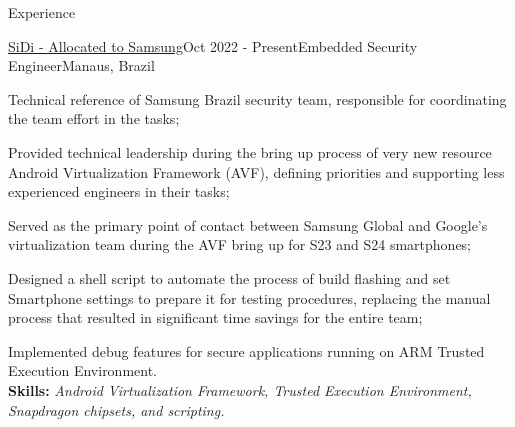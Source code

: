 \documentclass[
	11pt, %
]{resume} %
\begin{document}
\begin{rSection}{Experience}

	\begin{rSubsection}{\href{https://www.sidi.org.br/en/sobre-nos}{SiDi - Allocated to Samsung}}{Oct 2022 - Present}{Embedded Security Engineer}{Manaus, Brazil}
		\item Technical reference of Samsung Brazil security team, responsible for coordinating the team effort in the tasks;	
		\item Provided technical leadership during the bring up process of very new resource Android Virtualization Framework (AVF), defining priorities and supporting less experienced engineers in their tasks;
		\item Served as the primary point of contact between Samsung Global and Google's virtualization team during the AVF bring up for S23 and S24 smartphones;
		\item Designed a shell script to automate the process of build flashing and set Smartphone settings to prepare it for testing procedures, replacing the manual process that resulted in significant time savings for the entire team;
		\item Implemented debug features for secure applications running on ARM Trusted Execution Environment.	
		\vspace{0.2cm} \\\textbf{Skills:} \textit{Android Virtualization Framework, Trusted Execution Environment, Snapdragon chipsets, and scripting.}
	\end{rSubsection}


\end{rSection}
\end{document}
